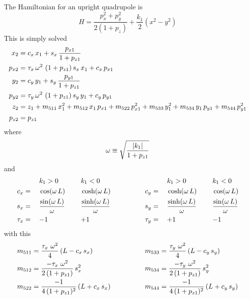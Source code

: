The Hamiltonian for an upright quadrupole is
\begin{equation}
  H = \frac{p_x^2 + p_y^2}{2 (1 + p_z)} + \frac{k_1}{2} (x^2 - y^2)
\end{equation}
This is simply solved
\begin{align}
  x_2    &= c_x \, x_1 + s_x \, \frac{p_{x1}}{1 + p_{z1}} \nonumber \\
  p_{x2} &= \tau_x \, \omega^2 \, \, (1 + p_{z1}) \, s_x \, x_1 + c_x \, p_{x1} \nonumber \\
  y_2    &= c_y \, y_1 + s_y \, \frac{p_{y1}}{1 + p_{z1}} \nonumber \\
  p_{y2} &= \tau_y \, \omega^2 \, \, (1 + p_{z1}) \, s_y \, y_1 + c_y \, p_{y1} \\
  z_2    &= z_1 + m_{511} \, x_1^2 + m_{512} \, x_1 \, p_{x1} + m_{522} \, p_{x1}^2 + 
                   m_{533} \, y_1^2 + m_{534} \, y_1 \, p_{y1} + m_{544} \, p_{y1}^2 \nonumber \\
  p_{z2} &= p_{z1} \nonumber
\end{align}
where 
\begin{equation}
  \omega \equiv \sqrt{\frac{|k_1|}{1 + p_{z1}}}
\end{equation}
and
\begin{alignat}{6}
         &\hspace*{3ex}  && k_1 > 0          &\hspace*{3ex}& k_1 < 0 & \qquad \qquad
         &\hspace*{3ex}  && k_1 > 0          &\hspace*{3ex}& k_1 < 0 \nonumber \\
     c_x &=   && \cos  (\omega \, L) && \cosh (\omega \, L) & \qquad \qquad
     c_y &=   && \cosh (\omega \, L) && \cos  (\omega \, L) \nonumber \\
     s_x &=   && \frac{\sin  (\omega \, L)}{\omega} && \frac{\sinh (\omega \, L)}{\omega} & \qquad \qquad
     s_y &=   && \frac{\sinh (\omega \, L)}{\omega} && \frac{\sin  (\omega \, L)}{\omega} \\
  \tau_x &=   && {-}1             && {+}1             & \qquad \qquad
  \tau_y &=   && {+}1             && {-}1             \nonumber
\end{alignat}
with this
\begin{alignat}{2}
  m_{511} &= \frac{\tau_x \,\, \omega^2}{4} \, (L - c_x \, s_x) & \qquad \qquad
  m_{533} &= \frac{\tau_y \,\, \omega^2}{4} \, (L - c_y \, s_y) \nonumber \\
  m_{512} &= \frac{-\tau_x \,\, \omega^2}{2 \, (1 + p_{z1})} \, s_x^2 & \qquad \qquad
  m_{534} &= \frac{-\tau_y \,\, \omega^2}{2 \, (1 + p_{z1})} \, s_y^2 \\
  m_{522} &= \frac{-1}{4 \, (1 + p_{z1})^2} \, (L + c_x \, s_x) & \qquad \qquad
  m_{544} &= \frac{-1}{4 \, (1 + p_{z1})^2} \, (L + c_y \, s_y) \nonumber
\end{alignat}

